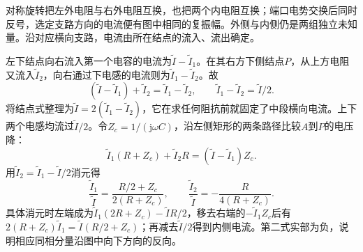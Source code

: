 \documentclass[UTF8,fontset=fandol,a4paper,11pt]{ctexart}
\begin{document}
对称旋转把左外电阻与右外电阻互换，也把两个内电阻互换；端口电势交换后同时反号，选定支路方向的电流便有图中相同的复振幅。外侧与内侧仍是两组独立未知量。沿对应横向支路，电流由所在结点的流入、流出确定。

左下结点向右流入第一个电容的电流为$\widetilde I-\widetilde I_1$。在其右方下侧结点$P$，从上方电阻又流入$\widetilde I_2$，向右通过下电感的电流则为$\widetilde I_1-\widetilde I_2$。故
\[
(\widetilde I-\widetilde I_1)+\widetilde I_2
=\widetilde I_1-\widetilde I_2,
\qquad
\boxed{\widetilde I_1-\widetilde I_2=\widetilde I/2}.
\]
将结点式整理为$\widetilde I=2(\widetilde I_1-\widetilde I_2)$，它在求任何阻抗前就固定了中段横向电流。上下两个电感均流过$\widetilde I/2$。令$Z_c=1/(\mathrm j\omega C)$，沿左侧矩形的两条路径比较$A$到$P$的电压降：
\[
\widetilde I_1(R+Z_c)+\widetilde I_2R
=(\widetilde I-\widetilde I_1)Z_c.
\]
用$\widetilde I_2=\widetilde I_1-\widetilde I/2$消元得
\[
\boxed{\frac{\widetilde I_1}{\widetilde I}
=\frac{R/2+Z_c}{2(R+Z_c)}},\qquad
\frac{\widetilde I_2}{\widetilde I}
=-\frac{R}{4(R+Z_c)}.
\]
具体消元时左端成为$\widetilde I_1(2R+Z_c)-\widetilde IR/2$，移去右端的$-\widetilde I_1Z_c$后有$2(R+Z_c)\widetilde I_1=\widetilde I(R/2+Z_c)$；再减去$\widetilde I/2$得到内侧电流。第二式实部为负，说明相应同相分量沿图中向下方向的反向。
\end{document}

